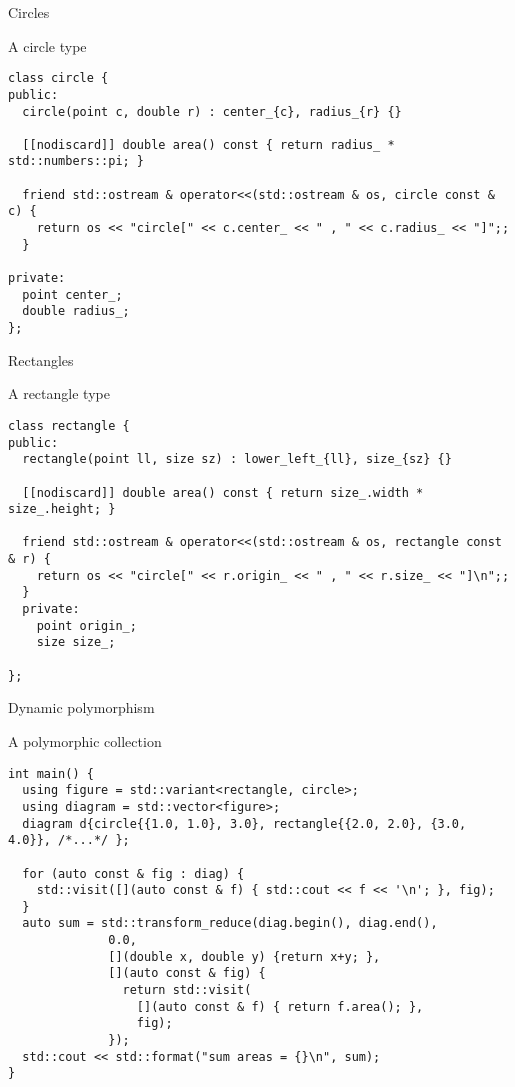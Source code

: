 \begin{frame}[t,fragile]{Circles}
\begin{block}{A circle type}
\begin{lstlisting}
class circle {
public:
  circle(point c, double r) : center_{c}, radius_{r} {}

  [[nodiscard]] double area() const { return radius_ * std::numbers::pi; }

  friend std::ostream & operator<<(std::ostream & os, circle const & c) {
    return os << "circle[" << c.center_ << " , " << c.radius_ << "]";;
  }

private:
  point center_;
  double radius_;
};
\end{lstlisting}
\end{block}
\end{frame}

\begin{frame}[t,fragile]{Rectangles}
\begin{block}{A rectangle type}
\begin{lstlisting}
class rectangle {
public:
  rectangle(point ll, size sz) : lower_left_{ll}, size_{sz} {}

  [[nodiscard]] double area() const { return size_.width * size_.height; }

  friend std::ostream & operator<<(std::ostream & os, rectangle const & r) {
    return os << "circle[" << r.origin_ << " , " << r.size_ << "]\n";;
  }
  private:
    point origin_;
    size size_;

};
\end{lstlisting}
\end{block}
\end{frame}

\begin{frame}[t,fragile]{Dynamic polymorphism}
\begin{block}{A polymorphic collection}
\begin{lstlisting}[basicstyle=\mode<presentation>{\tiny}]
int main() {
  using figure = std::variant<rectangle, circle>;
  using diagram = std::vector<figure>;
  diagram d{circle{{1.0, 1.0}, 3.0}, rectangle{{2.0, 2.0}, {3.0, 4.0}}, /*...*/ };

  for (auto const & fig : diag) {
    std::visit([](auto const & f) { std::cout << f << '\n'; }, fig);
  }
  auto sum = std::transform_reduce(diag.begin(), diag.end(), 
              0.0,
              [](double x, double y) {return x+y; },
              [](auto const & fig) {
                return std::visit(
                  [](auto const & f) { return f.area(); }, 
                  fig);
              });
  std::cout << std::format("sum areas = {}\n", sum);
}
\end{lstlisting}
\end{block}
\end{frame}



